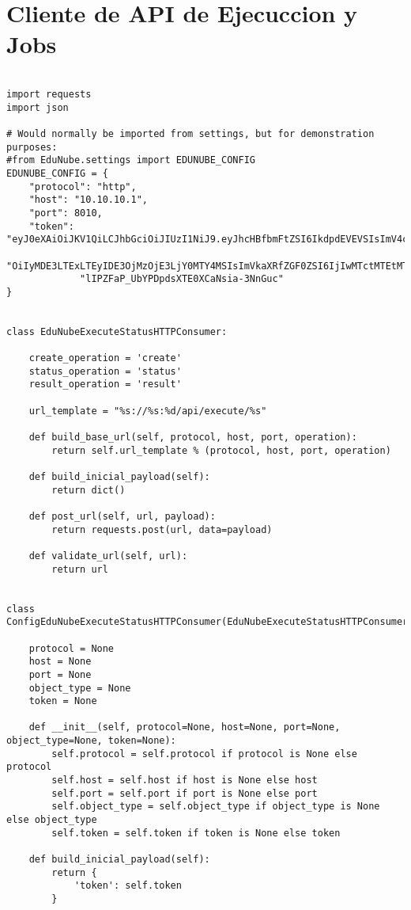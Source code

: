 \section{Cliente de API de Ejecuccion y Jobs}
\lstset{language=Python}
\begin{lstlisting}[breaklines]

import requests
import json

# Would normally be imported from settings, but for demonstration purposes:
#from EduNube.settings import EDUNUBE_CONFIG
EDUNUBE_CONFIG = {
    "protocol": "http",
    "host": "10.10.10.1",
    "port": 8010,
    "token": "eyJ0eXAiOiJKV1QiLCJhbGciOiJIUzI1NiJ9.eyJhcHBfbmFtZSI6IkdpdEVEVSIsImV4cGlyZXMiOmZhbHNlLCJjcmVhdGVkX2RhdGUi"
             "OiIyMDE3LTExLTEyIDE3OjMzOjE3LjY0MTY4MSIsImVkaXRfZGF0ZSI6IjIwMTctMTEtMTIgMjA6MzY6NDAuMjc5NDAyIn0.825oh2rZU"
             "lIPZFaP_UbYPDpdsXTE0XCaNsia-3NnGuc"
}


class EduNubeExecuteStatusHTTPConsumer:

    create_operation = 'create'
    status_operation = 'status'
    result_operation = 'result'

    url_template = "%s://%s:%d/api/execute/%s"

    def build_base_url(self, protocol, host, port, operation):
        return self.url_template % (protocol, host, port, operation)

    def build_inicial_payload(self):
        return dict()

    def post_url(self, url, payload):
        return requests.post(url, data=payload)

    def validate_url(self, url):
        return url


class ConfigEduNubeExecuteStatusHTTPConsumer(EduNubeExecuteStatusHTTPConsumer):

    protocol = None
    host = None
    port = None
    object_type = None
    token = None

    def __init__(self, protocol=None, host=None, port=None, object_type=None, token=None):
        self.protocol = self.protocol if protocol is None else protocol
        self.host = self.host if host is None else host
        self.port = self.port if port is None else port
        self.object_type = self.object_type if object_type is None else object_type
        self.token = self.token if token is None else token

    def build_inicial_payload(self):
        return {
            'token': self.token
        }


\end{lstlisting}
